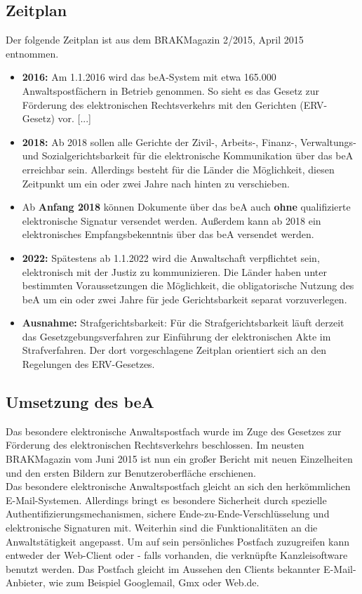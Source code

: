 \subsection{Zeitplan}
Der folgende Zeitplan ist aus dem BRAKMagazin 2/2015, April 2015 \cite{bea:bea:brak2-2015} entnommen.
\begin{itemize}
\item \textbf{2016:} Am 1.1.2016 wird das beA-System mit etwa 165.000 Anwaltspostfächern in Betrieb genommen. So sieht es das Gesetz zur Förderung des elektronischen Rechtsverkehrs mit den Gerichten (ERV-Gesetz) vor. [...]
\item \textbf{2018:} Ab 2018 sollen alle Gerichte der Zivil-, Arbeits-, Finanz-, Verwaltungs- und Sozialgerichtsbarkeit für die elektronische Kommunikation über das beA erreichbar sein. Allerdings besteht für die Länder die Möglichkeit, diesen Zeitpunkt um ein oder zwei Jahre nach hinten zu verschieben.
\item Ab \textbf{Anfang 2018} können Dokumente über das beA auch \textbf{ohne} qualifizierte elektronische Signatur versendet werden. Außerdem kann ab 2018 ein elektronisches Empfangsbekenntnis über das beA versendet werden.
\item \textbf{2022:} Spätestens ab 1.1.2022 wird die Anwaltschaft verpflichtet sein, elektronisch mit der Justiz zu kommunizieren. Die Länder haben unter bestimmten Voraussetzungen die Möglichkeit, die obligatorische Nutzung des beA um ein oder zwei Jahre für jede Gerichtsbarkeit separat vorzuverlegen.
\item \textbf{Ausnahme:} Strafgerichtsbarkeit: Für die Strafgerichtsbarkeit läuft derzeit das Gesetzgebungsverfahren zur Einführung der elektronischen Akte im Strafverfahren. Der dort vorgeschlagene Zeitplan orientiert sich an den Regelungen des ERV-Gesetzes.
\end{itemize}

\subsection{Umsetzung des beA}
Das besondere elektronische Anwaltspostfach wurde im Zuge des Gesetzes zur Förderung des elektronischen Rechtsverkehrs beschlossen. Im neusten BRAKMagazin vom Juni 2015 \cite{bea:bea:brak3-2015} ist nun ein großer Bericht mit neuen Einzelheiten und den ersten Bildern zur Benutzeroberfläche erschienen. \\
Das besondere elektronische Anwaltspostfach gleicht an sich den herkömmlichen E-Mail-Systemen. Allerdings bringt es besondere Sicherheit durch spezielle Authentifizierungsmechanismen, sichere Ende-zu-Ende-Verschlüsselung und elektronische Signaturen mit. Weiterhin sind die Funktionalitäten an die Anwaltstätigkeit angepasst. Um auf sein persönliches Postfach zuzugreifen kann entweder der Web-Client oder - falls vorhanden, die verknüpfte Kanzleisoftware benutzt werden. Das Postfach gleicht im Aussehen den Clients bekannter E-Mail-Anbieter, wie zum Beispiel Googlemail, Gmx oder Web.de.

